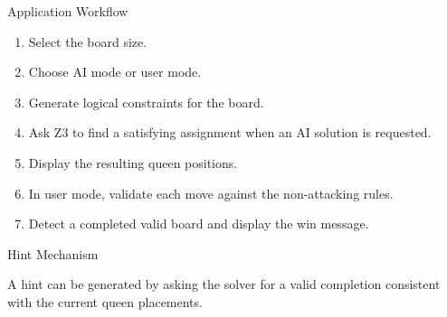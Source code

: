\documentclass[aspectratio=169,12pt]{beamer}
\begin{document}
\begin{frame}{Application Workflow}

\begin{enumerate}
    \item Select the board size.
    \item Choose AI mode or user mode.
    \item Generate logical constraints for the board.
    \item Ask Z3 to find a satisfying assignment when an
          AI solution is requested.
    \item Display the resulting queen positions.
    \item In user mode, validate each move against the
          non-attacking rules.
    \item Detect a completed valid board and display
          the win message.
\end{enumerate}

\begin{block}{Hint Mechanism}

A hint can be generated by asking the solver for a valid
completion consistent with the current queen placements.
\end{block}

\end{frame}

\end{document}
